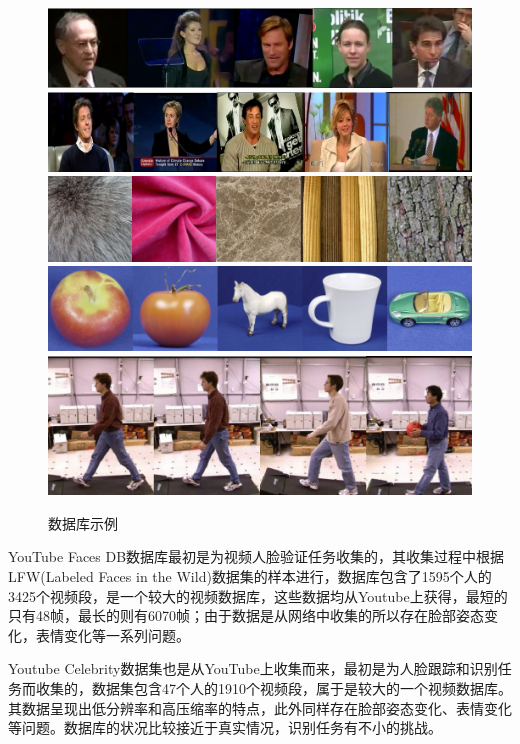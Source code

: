 \begin{figure}[htb]
	\centering
      	{\includegraphics[width=0.49\linewidth]{source/YTF.png}}
      	{\includegraphics[width=0.49\linewidth]{source/YTC.png}}
    	{\includegraphics[width=0.49\linewidth]{source/UIUC.png}}
      	{\includegraphics[width=0.49\linewidth]{source/ETH80.png}}
      	{\includegraphics[width=0.5\linewidth]{source/CMUMoBo.png}}
  	\caption{数据库示例}
  	\label{fig:databases_exmples}
\end{figure}
YouTube Faces DB数据库\cite{Database_YTF}最初是为视频人脸验证任务收集的，其收集过程中根据LFW(Labeled Faces in the Wild)\cite{Database_LFW}数据集的样本进行，数据库包含了1595个人的3425个视频段，是一个较大的视频数据库，这些数据均从Youtube上获得，最短的只有48帧，最长的则有6070帧；由于数据是从网络中收集的所以存在脸部姿态变化，表情变化等一系列问题。

Youtube Celebrity数据集\cite{Database_YTC}也是从YouTube上收集而来，最初是为人脸跟踪和识别任务而收集的，数据集包含47个人的1910个视频段，属于是较大的一个视频数据库。其数据呈现出低分辨率和高压缩率的特点，此外同样存在脸部姿态变化、表情变化等问题。数据库的状况比较接近于真实情况，识别任务有不小的挑战。

